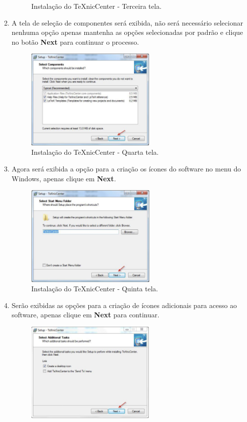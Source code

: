 \begin{enumerate}
\begin{figure}[H]
  \caption{Instalação do TeXnicCenter - Terceira tela.}
\end{figure}
\item A tela de seleção de componentes será exibida, não será necessário selecionar nenhuma opção apenas mantenha as opções selecionadas por padrão e clique no botão \textbf{Next} para continuar o processo.
\begin{figure}[H]
  \centering
  \includegraphics[width=0.6\textwidth]{./fig/texniccenter06}
  \caption{Instalação do TeXnicCenter - Quarta tela.}
\end{figure}
\item Agora será exibida a opção para a criação os ícones do software no menu do Windows, apenas clique em \textbf{Next}.
\begin{figure}[H]
  \centering
  \includegraphics[width=0.6\textwidth]{./fig/texniccenter07}
  \caption{Instalação do TeXnicCenter - Quinta tela.}
\end{figure}
\item Serão exibidas as opções para a criação de ícones adicionais para acesso ao software, apenas clique em \textbf{Next} para continuar.
\begin{figure}[H]
  \centering
  \includegraphics[width=0.6\textwidth]{./fig/texniccenter08}

\end{figure}
\end{enumerate}
